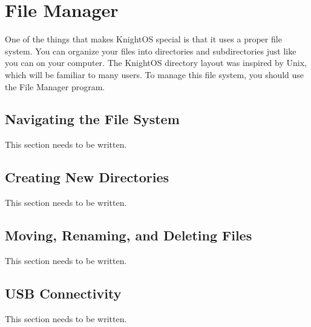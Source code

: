 \chapter{File Manager}

One of the things that makes KnightOS special is that it uses a proper file
system. You can organize your files into directories and subdirectories just like
you can on your computer. The KnightOS directory layout was inspired by Unix,
which will be familiar to many users. To manage this file system, you should use
the File Manager program.

\section{Navigating the File System}

This section needs to be written.

\section{Creating New Directories}

This section needs to be written.

\section{Moving, Renaming, and Deleting Files}

This section needs to be written.

\section{USB Connectivity}

This section needs to be written.
